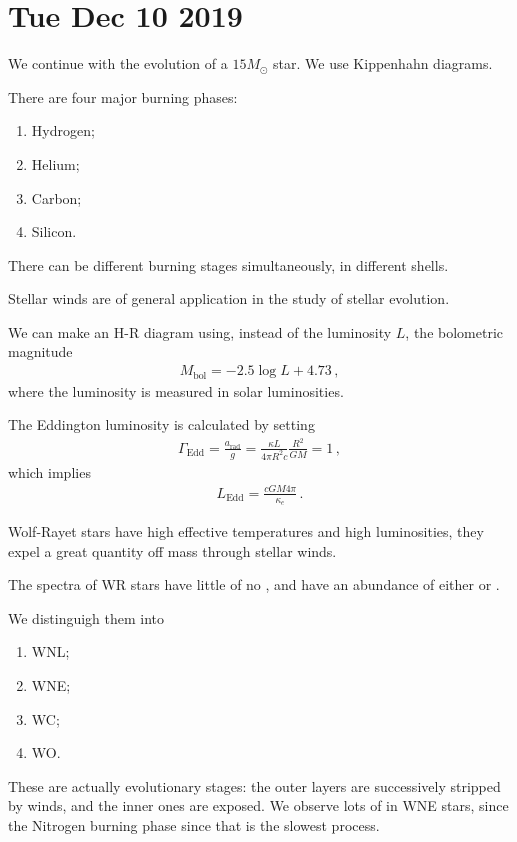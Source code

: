 \documentclass[main.tex]{subfiles}
\begin{document}
\section*{Tue Dec 10 2019}

We continue with the evolution of a \(15 M_{\odot}\) star. 
We use Kippenhahn diagrams. 

There are four major burning phases: 
%
\begin{enumerate}
    \item Hydrogen;
    \item Helium;
    \item Carbon;
    \item Silicon.
\end{enumerate}

There can be different burning stages simultaneously, in different shells. 

Stellar winds are of general application in the study of stellar evolution. 

We can make an H-R diagram using, instead of the luminosity \(L\), the bolometric magnitude 
%
\begin{align}
  M _{\text{bol}} = -2.5 \log L + 4.73
\,,
\end{align}
%
where the luminosity is measured in solar luminosities. 

The Eddington luminosity is calculated by  setting
%
\begin{align}
  \Gamma_{\text{Edd}} = \frac{a _{\text{rad}}}{g} = \frac{\kappa L}{4 \pi R^2 c} \frac{R^2}{GM} =1
\,,
\end{align}
%
which implies 
%
\begin{align}
  L _{\text{Edd}} = \frac{cGM 4 \pi }{\kappa_e}
\,.
\end{align}

Wolf-Rayet stars have high effective temperatures and high luminosities, they expel a great quantity off mass through stellar winds. 

The spectra of WR stars have little of no , and have an abundance of either  or .

We distinguigh them into 
\begin{enumerate}
    \item WNL;
    \item WNE;
    \item WC;
    \item WO.
\end{enumerate}

These are actually evolutionary stages: the outer layers are successively stripped by winds, and the inner ones are exposed.
We observe lots of  in WNE stars, since the Nitrogen burning phase since that is the slowest process. 
\end{document}
